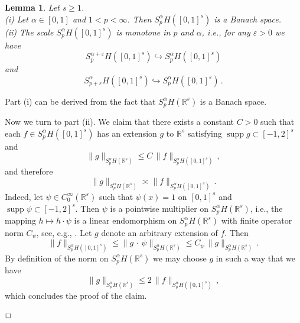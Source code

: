 \documentclass[12pt]{article}
\DeclareMathOperator{\supp}{supp}
\newtheorem{lemma}{Lemma}
\newenvironment{proof}{\begin{trivlist}
    \item[\hskip\labelsep{\it Proof.}]}{$\hfill\Box$\end{trivlist}}
\newcommand{\real}{\mathbb{R}}
\begin{document}
\begin{lemma}\label{Win_Lemma_13}
 Let $s\ge 1$. 
 \\
{\rm (i)} Let   $\alpha \in [0,1]$ and $1 < p<\infty$.
Then $ S^{\alpha}_{p}H([0,1]^s)$ is a Banach space.
\\
{\rm (ii)} The scale $ S^{\alpha}_{p}H([0,1]^s)$
is monotone in $p$ and $\alpha$, i.e., for any $\varepsilon >0$
we have 
\[
 S^{\alpha+\varepsilon}_{p}H([0,1]^s) \hookrightarrow  S^{\alpha}_{p}H([0,1]^s)
\]
 and 
 \[
 S^{\alpha}_{p+\varepsilon} H([0,1]^s) \hookrightarrow  S^{\alpha}_{p}H([0,1]^s)\, .
\]
 \end{lemma}

\begin{proof}
 Part (i) can be derived from the fact that 
 $ S^{\alpha}_{p}H(\real^s) $ is a Banach space.
 
 
Now we turn to 
 part (ii).
 We claim that there exists a constant $C>0$ such that each
 $f \in S^{\alpha}_{p}H([0,1]^s)$ has an extension $g$ to $\real^s$
 satisfying $\supp g \subset [-1,2]^s$ and
 \[
  \| g  \|_{S^{\alpha}_{p}H(\real^s)} \le C\, \| f  \|_{S^{\alpha}_{p}H([0,1]^s)}\,,
  \]
  and therefore
 \begin{equation}\label{eq:asymp_equiv}
  \| g \|_{S^{\alpha}_{p}H(\real^s)} \asymp \| f \|_{S^{\alpha}_{p}H([0,1]^s)} \, .
  \end{equation}
Indeed, let $\psi \in C_0^\infty (\real^s)$ such that $\psi (x)=1$ on 
$[0,1]^s$ and $\supp \psi \subset [-1,2]^s$. 
Then $\psi$ is a pointwise multiplier on  $S^{\alpha}_{p}H(\real^s)$, i.e.,
the mapping $h \mapsto  h \cdot \psi$ is a linear endomorphism on $S^{\alpha}_{p}H(\real^s)$ with finite operator norm $C_\psi$, see, e.g.,  \cite{NS}.
Let $g$ denote an arbitrary extension of $f$.
Then
\[
 \| f \|_{S^{\alpha}_{p}H([0,1]^s)}  \le  
 \| g\, \cdot \, \psi  \|_{S^{\alpha}_{p}H(\real^s)} 
 \le C_{\psi}\,
 \| g  \|_{S^{\alpha}_{p}H(\real^s)}\,.
 \]
 By definition of the norm on $S^{\alpha}_{p}H(\real^s)$ we may choose $g$ in such a way that  we have
 \[
  \| g \|_{S^{\alpha}_{p}H(\real^s)}  \le  2\, 
 \| f  \|_{S^{\alpha}_{p}H([0,1]^s)} \, , 
 \]
which concludes the proof of the claim. 


\end{proof}
\end{document}
